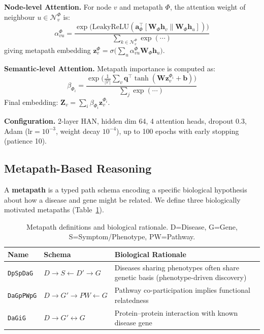 \documentclass{article}
\newcommand{\Vcal}{\mathcal{V}}
\begin{document}
\textbf{Node-level Attention.} For node $v$ and metapath $\Phi$, the attention weight of neighbour $u \in \mathcal{N}_v^\Phi$ is:
\begin{equation}
\alpha_{vu}^\Phi = \frac{
  \exp\!\bigl(\text{LeakyReLU}(\mathbf{a}_\Phi^\top[\mathbf{W}_\Phi\mathbf{h}_v \| \mathbf{W}_\Phi\mathbf{h}_u])\bigr)
}{
  \sum_{k\in\mathcal{N}_v^\Phi}\exp(\cdots)
}
\end{equation}
giving metapath embedding $\mathbf{z}_v^\Phi = \sigma\!\bigl(\sum_u \alpha_{vu}^\Phi \mathbf{W}_\Phi\mathbf{h}_u\bigr)$.

\textbf{Semantic-level Attention.} Metapath importance is computed as:
\begin{equation}
\beta_{\Phi_i} = \frac{
  \exp\!\bigl(\tfrac{1}{|\Vcal|}\sum_v \mathbf{q}^\top\tanh(\mathbf{W}\mathbf{z}_v^{\Phi_i}+\mathbf{b})\bigr)
}{
  \sum_j\exp(\cdots)
}
\end{equation}
Final embedding: $\mathbf{Z}_v = \sum_i \beta_{\Phi_i}\mathbf{z}_v^{\Phi_i}$.

\textbf{Configuration.} 2-layer HAN, hidden dim 64, 4 attention heads, dropout 0.3, Adam ($\text{lr}=10^{-3}$, weight decay $10^{-4}$), up to 100 epochs with early stopping (patience 10).

\subsection{Metapath-Based Reasoning}

A \textbf{metapath} is a typed path schema encoding a specific biological hypothesis about how a disease and gene might be related. We define three biologically motivated metapaths (Table~\ref{tab:mp}).

\begin{table}[h]
\centering
\small
\caption{Metapath definitions and biological rationale. D=Disease, G=Gene, S=Symptom/Phenotype, PW=Pathway.}
\label{tab:mp}
\vspace{-0.5em}
\begin{tabular}{llp{4.5cm}}
\toprule
\textbf{Name} & \textbf{Schema} & \textbf{Biological Rationale} \\
\midrule
\texttt{DpSpDaG} & $D\!\to\!S\!\leftarrow\!D'\!\to\!G$ & Diseases sharing phenotypes often share genetic basis (phenotype-driven discovery) \\
\texttt{DaGpPWpG} & $D\!\to\!G'\!\to\!PW\!\leftarrow\!G$ & Pathway co-participation implies functional relatedness \\
\texttt{DaGiG} & $D\!\to\!G'\!\leftrightarrow\!G$ & Protein--protein interaction with known disease gene \\
\bottomrule
\end{tabular}
\end{table}
\end{document}
